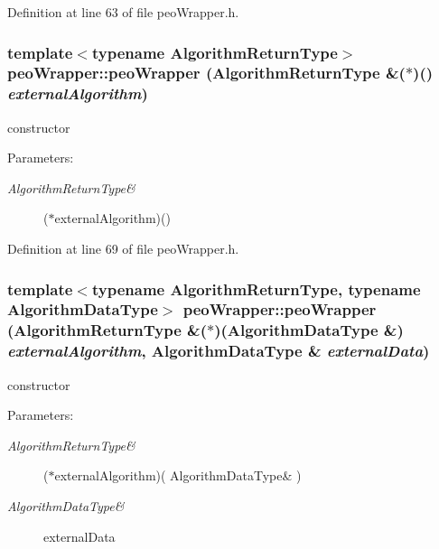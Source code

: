 Definition at line 63 of file peo\-Wrapper.h.\hypertarget{classpeoWrapper_593608a5637ba48e0cc3471f093b42bb}{
\subsubsection[peoWrapper]{\setlength{\rightskip}{0pt plus 5cm}template$<$typename Algorithm\-Return\-Type$>$ peo\-Wrapper::peo\-Wrapper (Algorithm\-Return\-Type \&($\ast$)() {\em external\-Algorithm})}}
\label{classpeoWrapper_593608a5637ba48e0cc3471f093b42bb}


constructor 

\begin{Desc}
\item[Parameters:]
\begin{description}
\item[{\em Algorithm\-Return\-Type\&}]($\ast$external\-Algorithm)() \end{description}
\end{Desc}


Definition at line 69 of file peo\-Wrapper.h.\hypertarget{classpeoWrapper_b4a2e26d0806791847db1695ec46cce1}{
\subsubsection[peoWrapper]{\setlength{\rightskip}{0pt plus 5cm}template$<$typename Algorithm\-Return\-Type, typename Algorithm\-Data\-Type$>$ peo\-Wrapper::peo\-Wrapper (Algorithm\-Return\-Type \&($\ast$)(Algorithm\-Data\-Type \&) {\em external\-Algorithm}, Algorithm\-Data\-Type \& {\em external\-Data})}}
\label{classpeoWrapper_b4a2e26d0806791847db1695ec46cce1}


constructor 

\begin{Desc}
\item[Parameters:]
\begin{description}
\item[{\em Algorithm\-Return\-Type\&}]($\ast$external\-Algorithm)( Algorithm\-Data\-Type\& ) \item[{\em Algorithm\-Data\-Type\&}]external\-Data \end{description}
\end{Desc}


